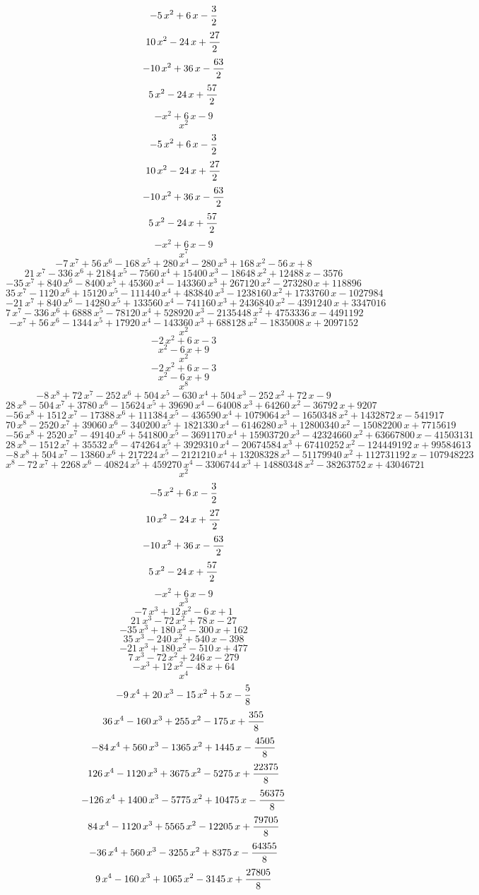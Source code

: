 $$-5\,x^2+6\,x-{{3}\over{2}}$$
$$10\,x^2-24\,x+{{27}\over{2}}$$
$$-10\,x^2+36\,x-{{63}\over{2}}$$
$$5\,x^2-24\,x+{{57}\over{2}}$$
$$-x^2+6\,x-9$$
$$x^2$$
$$-5\,x^2+6\,x-{{3}\over{2}}$$
$$10\,x^2-24\,x+{{27}\over{2}}$$
$$-10\,x^2+36\,x-{{63}\over{2}}$$
$$5\,x^2-24\,x+{{57}\over{2}}$$
$$-x^2+6\,x-9$$
$$x^7$$
$$-7\,x^7+56\,x^6-168\,x^5+280\,x^4-280\,x^3+168\,x^2-56\,x+8$$
$$21\,x^7-336\,x^6+2184\,x^5-7560\,x^4+15400\,x^3-18648\,x^2+12488\,x
 -3576$$
$$-35\,x^7+840\,x^6-8400\,x^5+45360\,x^4-143360\,x^3+267120\,x^2-
 273280\,x+118896$$
$$35\,x^7-1120\,x^6+15120\,x^5-111440\,x^4+483840\,x^3-1238160\,x^2+
 1733760\,x-1027984$$
$$-21\,x^7+840\,x^6-14280\,x^5+133560\,x^4-741160\,x^3+2436840\,x^2-
 4391240\,x+3347016$$
$$7\,x^7-336\,x^6+6888\,x^5-78120\,x^4+528920\,x^3-2135448\,x^2+
 4753336\,x-4491192$$
$$-x^7+56\,x^6-1344\,x^5+17920\,x^4-143360\,x^3+688128\,x^2-1835008\,
 x+2097152$$
$$x^2$$
$$-2\,x^2+6\,x-3$$
$$x^2-6\,x+9$$
$$x^2$$
$$-2\,x^2+6\,x-3$$
$$x^2-6\,x+9$$
$$x^8$$
$$-8\,x^8+72\,x^7-252\,x^6+504\,x^5-630\,x^4+504\,x^3-252\,x^2+72\,x-
 9$$
$$28\,x^8-504\,x^7+3780\,x^6-15624\,x^5+39690\,x^4-64008\,x^3+64260\,
 x^2-36792\,x+9207$$
$$-56\,x^8+1512\,x^7-17388\,x^6+111384\,x^5-436590\,x^4+1079064\,x^3-
 1650348\,x^2+1432872\,x-541917$$
$$70\,x^8-2520\,x^7+39060\,x^6-340200\,x^5+1821330\,x^4-6146280\,x^3+
 12800340\,x^2-15082200\,x+7715619$$
$$-56\,x^8+2520\,x^7-49140\,x^6+541800\,x^5-3691170\,x^4+15903720\,x^
 3-42324660\,x^2+63667800\,x-41503131$$
$$28\,x^8-1512\,x^7+35532\,x^6-474264\,x^5+3929310\,x^4-20674584\,x^3
 +67410252\,x^2-124449192\,x+99584613$$
$$-8\,x^8+504\,x^7-13860\,x^6+217224\,x^5-2121210\,x^4+13208328\,x^3-
 51179940\,x^2+112731192\,x-107948223$$
$$x^8-72\,x^7+2268\,x^6-40824\,x^5+459270\,x^4-3306744\,x^3+14880348
 \,x^2-38263752\,x+43046721$$
$$x^2$$
$$-5\,x^2+6\,x-{{3}\over{2}}$$
$$10\,x^2-24\,x+{{27}\over{2}}$$
$$-10\,x^2+36\,x-{{63}\over{2}}$$
$$5\,x^2-24\,x+{{57}\over{2}}$$
$$-x^2+6\,x-9$$
$$x^3$$
$$-7\,x^3+12\,x^2-6\,x+1$$
$$21\,x^3-72\,x^2+78\,x-27$$
$$-35\,x^3+180\,x^2-300\,x+162$$
$$35\,x^3-240\,x^2+540\,x-398$$
$$-21\,x^3+180\,x^2-510\,x+477$$
$$7\,x^3-72\,x^2+246\,x-279$$
$$-x^3+12\,x^2-48\,x+64$$
$$x^4$$
$$-9\,x^4+20\,x^3-15\,x^2+5\,x-{{5}\over{8}}$$
$$36\,x^4-160\,x^3+255\,x^2-175\,x+{{355}\over{8}}$$
$$-84\,x^4+560\,x^3-1365\,x^2+1445\,x-{{4505}\over{8}}$$
$$126\,x^4-1120\,x^3+3675\,x^2-5275\,x+{{22375}\over{8}}$$
$$-126\,x^4+1400\,x^3-5775\,x^2+10475\,x-{{56375}\over{8}}$$
$$84\,x^4-1120\,x^3+5565\,x^2-12205\,x+{{79705}\over{8}}$$
$$-36\,x^4+560\,x^3-3255\,x^2+8375\,x-{{64355}\over{8}}$$
$$9\,x^4-160\,x^3+1065\,x^2-3145\,x+{{27805}\over{8}}$$
